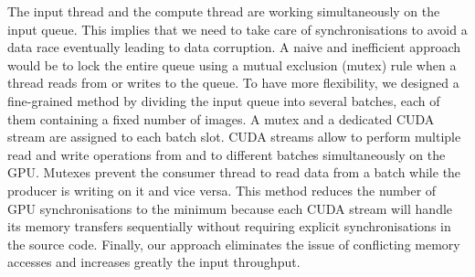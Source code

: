 The input thread and the compute thread are working simultaneously on the input queue. This implies that we need to take care of synchronisations to avoid a data race eventually leading to data corruption. A naive and inefficient approach would be to lock the entire queue using a mutual exclusion (mutex) rule when a thread reads from or writes to the queue. To have more flexibility, we designed a fine-grained method by dividing the input queue into several batches, each of them containing a fixed number of images. A mutex and a dedicated CUDA stream are assigned to each batch slot. CUDA streams allow to perform multiple read and write operations from and to different batches simultaneously on the GPU. Mutexes prevent the consumer thread to read data from a batch while the producer is writing on it and vice versa. This method reduces the number of GPU synchronisations to the minimum because each CUDA stream will handle its memory transfers sequentially without requiring explicit synchronisations in the source code. Finally, our approach eliminates the issue of conflicting memory accesses and increases greatly the input throughput.